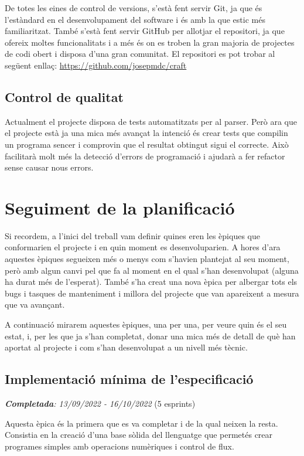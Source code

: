 ﻿\documentclass{article}
\begin{document}
De totes les eines de control de versions, s'està fent servir Git, ja que és
l'estàndard en el desenvolupament del software i és amb la que estic més 
familiaritzat. També s'està fent servir GitHub per allotjar el repositori, ja 
que ofereix moltes funcionalitats i a més és on es troben la gran majoria de
projectes de codi obert i disposa d'una gran comunitat. El repositori es pot 
trobar al següent enllaç: \url{https://github.com/josepmdc/craft}

\subsection{Control de qualitat}
Actualment el projecte disposa de tests automatitzats per al parser. Però ara
que el projecte està ja una mica més avançat la intenció és crear tests que 
compilin un programa sencer i comprovin que el resultat obtingut sigui el
correcte. Això facilitarà molt més la detecció d'errors de programació i ajudarà
a fer refactor sense causar nous errors.

\section{Seguiment de la planificació}

Si recordem, a l'inici del treball vam definir quines eren les èpiques que
conformarien el projecte i en quin moment es desenvoluparien. A hores d'ara
aquestes èpiques segueixen més o menys com s'havien plantejat al seu moment,
però amb algun canvi pel que fa al moment en el qual s'han desenvolupat (alguna
ha durat més de l'esperat). També s'ha creat una nova èpica per albergar tots
els bugs i tasques de manteniment i millora del projecte que van apareixent a
mesura que va avançant. 

A continuació mirarem aquestes èpiques, una per una, per veure quin és el seu
estat, i, per les que ja s'han completat, donar una mica més de detall de què
han aportat al projecte i com s'han desenvolupat a un nivell més tècnic.

\subsection{Implementació mínima de l'especificació}
\textit{\textbf{Completada}: 13/09/2022 - 16/10/2022} (5 esprints)

Aquesta èpica és la primera que es va completar i de la qual neixen la resta.
Consistia en la creació d'una base sòlida del llenguatge que permetés crear
programes simples amb operacions numèriques i control de flux.
\end{document}
